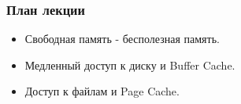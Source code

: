 \begin{frame}
\frametitle{План лекции}
\begin{itemize}
  \item Свободная память - бесполезная память.
  \item Медленный доступ к диску и Buffer Cache.
  \item Доступ к файлам и Page Cache.
\end{itemize}
\end{frame}

